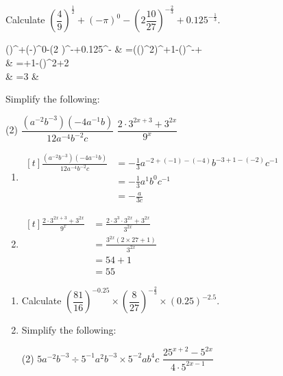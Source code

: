 \documentclass{report}
\begin{document}
\begin{question}
	Calculate $\left(\dfrac{4}{9}\right)^{\frac{1}{2}}+(-\pi)^0-\left(2 \dfrac{10}{27}\right)^{-\frac{2}{3}}+0.125^{-\frac{1}{3}}$.
	
	\sol{}
	\begin{flalign*}
		\left(\right)^{}+(-\pi)^0-\left(2 \right)^{-}+0.125^{-} & =\left(\left(\right)^2\right)^{}+1-\left(\right)^{-}+ \\ & =+1-\left(\right)^2+2 \\ & =3  &
	\end{flalign*}
\end{question}

\newpage
\begin{question}
	Simplify the following:
	\begin{tasks}[label=(\alph*)](2)
		\task $\dfrac{\left(a^{-2} b^{-3}\right)\left(-4 a^{-1} b\right)}{12 a^{-4} b^{-2} c}$
		\task $\dfrac{2 \cdot 3^{2 x+3}+3^{2 x}}{9^x}$
	\end{tasks}
	
	\sol{}
	\begin{enumerate}[label=(\alph*)]
		\item $\begin{aligned}[t] \frac{\left(a^{-2} b^{-3}\right)\left(-4 a^{-1} b\right)}{12 a^{-4} b^{-2} c} & =-\frac{1}{3} a^{-2+(-1)-(-4)} b^{-3+1-(-2)} c^{-1} \\ & =-\frac{1}{3} a^1 b^0 c^{-1} \\ & =-\frac{a}{3 c}\end{aligned}$
		\item $\begin{aligned}[t] \frac{2 \cdot 3^{2 x+3}+3^{2 x}}{9^x} & =\frac{2 \cdot 3^3 \cdot 3^{2 x}+3^{2 x}}{3^{2 x}} \\ & =\frac{3^{2 x}(2 \times 27+1)}{3^{2 x}} \\ & =54+1 \\ & =55\end{aligned}$
	\end{enumerate}
\end{question}

\begin{enumerate}
	\item Calculate $\left(\dfrac{81}{16}\right)^{-0.25} \times\left(\dfrac{8}{27}\right)^{-\frac{2}{3}} \times(0.25)^{-2.5}$.
	\item Simplify the following:
	      \begin{tasks}[label=(\alph*)](2)
	      	\task $5 a^{-2} b^{-3} \div 5^{-1} a^2 b^{-3} \times 5^{-2} a b^4 c$
	      	\task $\dfrac{25^{x+2}-5^{2 x}}{4 \cdot 5^{2 x-1}}$
	      \end{tasks}
\end{enumerate}
\end{document}
